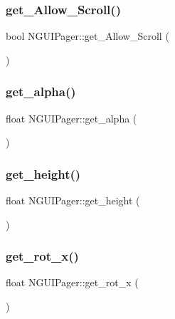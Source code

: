\subsubsection{\texorpdfstring{get\+\_\+\+Allow\+\_\+\+Scroll()}{get\_Allow\_Scroll()}}
{\footnotesize\ttfamily bool N\+G\+U\+I\+Pager\+::get\+\_\+\+Allow\+\_\+\+Scroll (\begin{DoxyParamCaption}{ }\end{DoxyParamCaption})}

\hypertarget{class_n_g_u_i_pager_a15c892c9cef9ef1f0e15b6c68253cc22}{}\label{class_n_g_u_i_pager_a15c892c9cef9ef1f0e15b6c68253cc22} 
\subsubsection{\texorpdfstring{get\+\_\+alpha()}{get\_alpha()}}
{\footnotesize\ttfamily float N\+G\+U\+I\+Pager\+::get\+\_\+alpha (\begin{DoxyParamCaption}{ }\end{DoxyParamCaption})}

\hypertarget{class_n_g_u_i_pager_a5fc8a208dd78934d8355a64c4102b40e}{}\label{class_n_g_u_i_pager_a5fc8a208dd78934d8355a64c4102b40e} 
\subsubsection{\texorpdfstring{get\+\_\+height()}{get\_height()}}
{\footnotesize\ttfamily float N\+G\+U\+I\+Pager\+::get\+\_\+height (\begin{DoxyParamCaption}{ }\end{DoxyParamCaption})}

\hypertarget{class_n_g_u_i_pager_a581e6a8aa26176540d12549cd87a44c3}{}\label{class_n_g_u_i_pager_a581e6a8aa26176540d12549cd87a44c3} 
\subsubsection{\texorpdfstring{get\+\_\+rot\+\_\+x()}{get\_rot\_x()}}
{\footnotesize\ttfamily float N\+G\+U\+I\+Pager\+::get\+\_\+rot\+\_\+x (\begin{DoxyParamCaption}{ }\end{DoxyParamCaption})}

